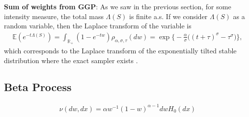 \documentclass{article}
\begin{document}
\textbf{Sum of weights from GGP}: As we saw in the previous section, for some intensity measure, the total mass $\Lambda(S)$ is finite a.s. If we consider $\Lambda(S)$ as a random variable, then the Laplace transform of the variable is
\begin{align}
\mathbb{E}(e^{-t\Lambda(S)}) = \int_{\mathbb{R}_+} (1- e^{-tw}) \rho_{\alpha, \sigma, \tau}(dw) = \exp\bigg\{-\frac{\alpha}{\sigma}\big((t+\tau)^\sigma - \tau^\sigma\big)\bigg\},
\end{align}
which corresponds to the Laplace transform of the exponentially tilted stable distribution where the exact sampler exists \citep{devroye2009random,hofert2011sampling}.

\subsection{Beta Process}
\begin{align}
\nu(dw, dx) = \alpha w^{-1}(1-w)^{\alpha-1} dw H_0(dx)
\end{align}




\end{document}
